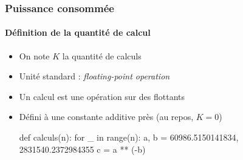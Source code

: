 \documentclass[a4paper,11pt]{beamer}
\begin{document}
\begin{frame}[fragile]
    \frametitle{Puissance consommée}
    \framesubtitle{Définition de la quantité de calcul}

    \begin{itemize}
        \item On note $K$ la quantité de calculs
        \item Unité standard : \textit{floating-point operation}
        \item Un calcul est une opération sur des flottants
        \item Défini à une constante additive près (au repos, $K = 0$)
        \begin{python}
def calculs(n):
    for _ in range(n):
        a, b = 60986.5150141834, 2831540.2372984355
        c = a ** (-b)
        \end{python}
    \end{itemize}
\end{frame}
\end{document}
